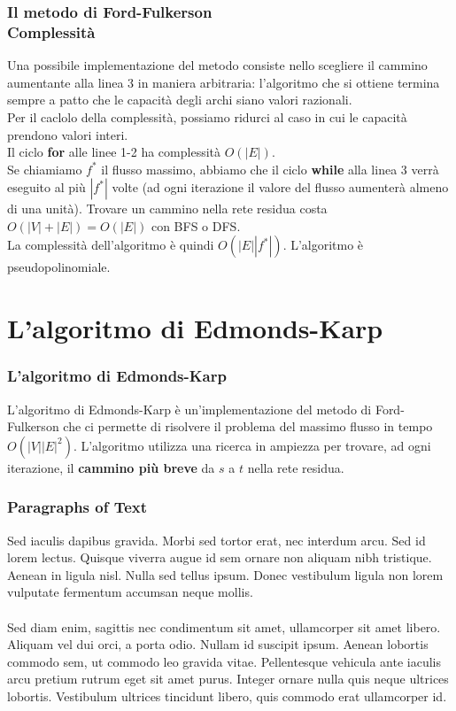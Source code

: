 \documentclass{beamer}
\begin{document}
\begin{frame}
\frametitle{Il metodo di Ford-Fulkerson\\Complessità}
Una possibile implementazione del metodo consiste nello scegliere il cammino aumentante alla linea 3 in maniera arbitraria: l'algoritmo che si ottiene termina sempre a patto che le capacità degli archi siano valori razionali.\\
Per il caclolo della complessità, possiamo ridurci al caso in cui le capacità prendono valori interi.\\
Il ciclo \textbf{for} alle linee 1-2 ha complessità $O(|E|)$.\\
Se chiamiamo $f^*$ il flusso massimo, abbiamo che il ciclo \textbf{while} alla linea 3 verrà eseguito al più $|f^*|$ volte (ad ogni iterazione il valore del flusso aumenterà almeno di una unità). Trovare un cammino nella rete residua costa $O(|V|+|E|)=O(|E|)$ con BFS o DFS.\\
La complessità dell'algoritmo è quindi $O(|E||f^*|)$. L'algoritmo è pseudopolinomiale.
\end{frame}

\section{L'algoritmo di Edmonds-Karp}

\begin{frame}
\frametitle{L'algoritmo di Edmonds-Karp}
L'algoritmo di Edmonds-Karp è un'implementazione del metodo di Ford-Fulkerson che ci permette di risolvere il problema del massimo flusso in tempo $O(|V||E|^2)$. L'algoritmo utilizza una ricerca in ampiezza per trovare, ad ogni iterazione, il \textbf{cammino più breve} da $s$ a $t$ nella rete residua.
\end{frame}

\begin{frame}
\end{frame}

\begin{frame}
\frametitle{Paragraphs of Text}
Sed iaculis dapibus gravida. Morbi sed tortor erat, nec interdum arcu. Sed id lorem lectus. Quisque viverra augue id sem ornare non aliquam nibh tristique. Aenean in ligula nisl. Nulla sed tellus ipsum. Donec vestibulum ligula non lorem vulputate fermentum accumsan neque mollis.\\~\\

Sed diam enim, sagittis nec condimentum sit amet, ullamcorper sit amet libero. Aliquam vel dui orci, a porta odio. Nullam id suscipit ipsum. Aenean lobortis commodo sem, ut commodo leo gravida vitae. Pellentesque vehicula ante iaculis arcu pretium rutrum eget sit amet purus. Integer ornare nulla quis neque ultrices lobortis. Vestibulum ultrices tincidunt libero, quis commodo erat ullamcorper id.
\end{frame}
\end{document}
